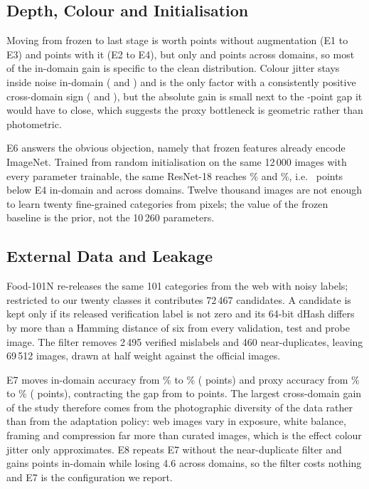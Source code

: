 \documentclass[conference]{IEEEtran}
\begin{document}
\subsection{Depth, Colour and Initialisation}
Moving from frozen to last stage is worth \gainFinetuneNoaug{} points without
augmentation (E1 to E3) and \gainFinetuneAug{} points with it (E2 to E4), but
only \gainCanFinetuneNoaug{} and \gainCanFinetuneAug{} points across domains, so
most of the in-domain gain is specific to the clean distribution. Colour jitter
stays inside noise in-domain (\gainAugFrozen{} and \gainAugFinetune) and is the
only factor with a consistently positive cross-domain sign (\gainCanAugFrozen{}
and \gainCanAugFinetune), but the absolute gain is small next to the
\gapFour-point gap it would have to close, which suggests the proxy bottleneck is
geometric rather than photometric.

E6 answers the obvious objection, namely that frozen features already encode
ImageNet. Trained from random initialisation on the same 12\,000 images with every
parameter trainable, the same ResNet-18 reaches \accTestSix\% and \accCanSix\%,
i.e.\ \scratchDrop{} points below E4 in-domain and \scratchDropCan{} across
domains. Twelve thousand images are not enough to learn twenty fine-grained
categories from pixels; the value of the frozen baseline is the prior, not the
10\,260 parameters.

\subsection{External Data and Leakage}
Food-101N \cite{lee2018cleannet} re-releases the same 101 categories from the web
with noisy labels; restricted to our twenty classes it contributes 72\,467
candidates. A candidate is kept only if its released verification label is not
zero and its 64-bit dHash differs by more than a Hamming distance of six from
every validation, test and probe image. The filter removes 2\,495 verified
mislabels and 460 near-duplicates, leaving 69\,512 images, drawn at half weight
against the official images.

E7 moves in-domain accuracy from \accTestFour\% to \accTestSeven\%
(\gainExternal{} points) and proxy accuracy from \accCanFour\% to \accCanSeven\%
(\gainCanExternal{} points), contracting the gap from \gapFour{} to \gapSeven{}
points. The largest cross-domain gain of the study therefore comes from the
photographic diversity of the data rather than from the adaptation policy: web
images vary in exposure, white balance, framing and compression far more than
curated images, which is the effect colour jitter only approximates. E8 repeats
E7 without the near-duplicate filter and gains \leakTest{} points in-domain while
losing 4.6 across domains, so the filter costs nothing and E7 is the configuration
we report.
\end{document}
